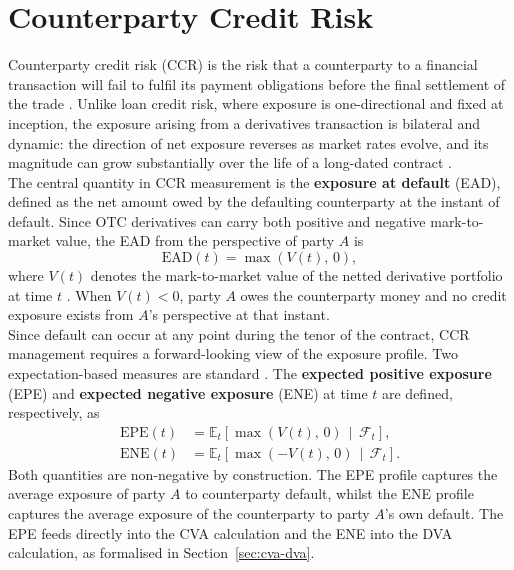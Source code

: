     \section*{Counterparty Credit Risk}
    \label{sec:ccr}

    \noindent
    Counterparty credit risk (CCR) is the risk that a counterparty to a financial transaction will fail to fulfil its payment obligations before the final settlement of the trade \cite{Green_2016}. Unlike loan credit risk, where exposure is one-directional and fixed at inception, the exposure arising from a derivatives transaction is bilateral and dynamic: the direction of net exposure reverses as market rates evolve, and its magnitude can grow substantially over the life of a long-dated contract \cite{cesari2009modelling, Gregory_2015}. \\

    \noindent
    The central quantity in CCR measurement is the \textbf{exposure at default} (EAD), defined as the net amount owed by the defaulting counterparty at the instant of default. Since OTC derivatives can carry both positive and negative mark-to-market value, the EAD from the perspective of party $A$ is
    \begin{equation}
        \text{EAD}(t) = \max\!\left(V(t),\, 0\right),
        \label{eq:EAD}
    \end{equation}
    where $V(t)$ denotes the mark-to-market value of the netted derivative portfolio at time $t$ \cite{Gregory_2015}. When $V(t) < 0$, party $A$ owes the counterparty money and no credit exposure exists from $A$'s perspective at that instant. \\

    \noindent
    Since default can occur at any point during the tenor of the contract, CCR management requires a forward-looking view of the exposure profile. Two expectation-based measures are standard \cite{canabarro2003measuring, zhu2007guide}. The \textbf{expected positive exposure} (EPE) and \textbf{expected negative exposure} (ENE) at time $t$ are defined, respectively, as
    \begin{align}
        \text{EPE}(t) &= \mathbb{E}_t\!\left[\max\!\left(V(t),\, 0\right)\,\middle|\,\mathcal{F}_t\right], \label{eq:EPE} \\[4pt]
        \text{ENE}(t) &= \mathbb{E}_t\!\left[\max\!\left(-V(t),\, 0\right)\,\middle|\,\mathcal{F}_t\right]. \label{eq:ENE}
    \end{align}
    Both quantities are non-negative by construction. The EPE profile captures the average exposure of party $A$ to counterparty default, whilst the ENE profile captures the average exposure of the counterparty to party $A$'s own default. The EPE feeds directly into the CVA calculation and the ENE into the DVA calculation, as formalised in Section~\ref{sec:cva-dva}. \\

